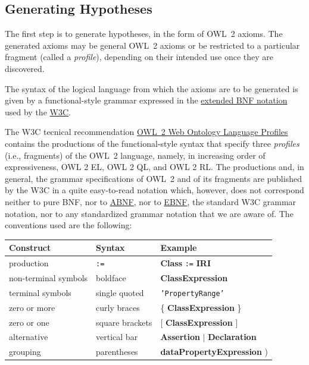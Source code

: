 \documentclass[a4paper]{article}
\newcounter{ex}
\begin{document}
\subsection{Generating Hypotheses}
\label{generating-hypotheses}

The first step is to generate hypotheses, in the form of OWL~2 axioms.
The generated axioms may be general OWL~2 axioms or be restricted to a particular
fragment (called a \emph{profile}), depending on their intended use once they
are discovered.

The syntax of the logical language from which the axioms are to be
generated is given by a functional-style grammar expressed in the
\href{"http://www.w3.org/TR/2012/REC-owl2-syntax-20121211/#BNF_Notation}{extended BNF notation}
used by the \href{http://www.w3.org/}{W3C}.

The W3C tecnical recommendation \href{http://www.w3.org/TR/owl2-profiles}{OWL~2
Web Ontology Language Profiles} contains the productions of the functional-style syntax
that specify three \emph{profiles} (i.e., fragments) of the OWL~2 language,
namely, in increasing order of expressiveness, OWL 2 EL, OWL 2 QL, and OWL 2 RL.
The productions and, in general, the grammar specifications of OWL~2 and of its
fragments are published by the W3C in a quite easy-to-read notation which, however,
does not correspond neither to pure BNF,
nor to \href{http://tools.ietf.org/html/rfc5234}{ABNF},
nor to \href{http://www.w3.org/TR/xquery/#EBNFNotation}{EBNF},
the standard W3C grammar notation,
nor to any standardized grammar notation that we are aware of.
The conventions used are the following:
\begin{center}
  \begin{tabular}{|l|l|l|}
  \hline
    \sc Construct & \sc Syntax & \sc Example \\
  \hline
    production           & \texttt{:=}     & \textbf{Class} \texttt{:=} \textbf{IRI} \\
    non-terminal symbols & boldface        & \textbf{ClassExpression} \\
    terminal symbols     & single quoted   & \texttt{'PropertyRange'} \\
    zero or more         & curly braces    & \{ \textbf{ClassExpression} \} \\
    zero or one          & square brackets & [ \textbf{ClassExpression} ] \\
    alternative          & vertical bar    & \textbf{Assertion} $\mid$ \textbf{Declaration} \\
    grouping             & parentheses     & \textbf{dataPropertyExpression} ) \\
  \hline
  \end{tabular}
\end{center}
\end{document}
